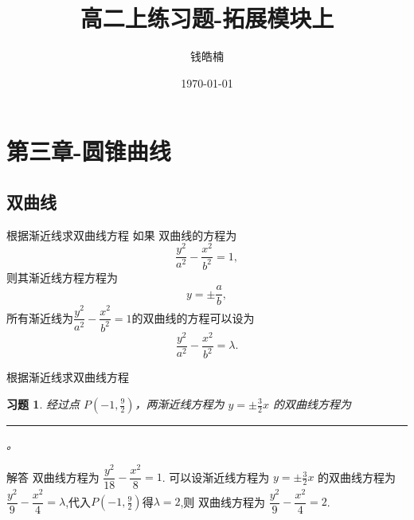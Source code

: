 \documentclass[handout,aspectratio=169]{ctexbeamer}
\newcommand{\uline}{\rule{1cm}{0.6pt}}
\newtheorem{exercise}{习题}[subsection]
\begin{document}

\title{高二上练习题-拓展模块上}
\date{\today}
\author{钱皓楠}
\begin{frame}{}{}
    \titlepage{}
\end{frame}

\section{第三章-圆锥曲线}
\subsection{双曲线}

\begin{frame}{根据渐近线求双曲线方程}{}
如果 双曲线的方程为 $$\dfrac{y^2}{a^2} - \dfrac{x^2}{b^2} = 1,$$则其渐近线方程方程为\[y =\pm \frac{a}{b} ,\]
所有渐近线为$\dfrac{y^2}{a^2} - \dfrac{x^2}{b^2} = 1$的双曲线的方程可以设为\[\dfrac{y^2}{a^2} - \dfrac{x^2}{b^2} = \lambda.\]
\end{frame}


\begin{frame}{根据渐近线求双曲线方程}{}
    \begin{exercise}
        经过点 $P(-1,\frac{9}{2})$，两渐近线方程为 $y = \pm \frac{3}{2}x$ 的双曲线方程为\uline。
    \end{exercise}

    \begin{block}{解答}
        双曲线方程为 $\dfrac{y^2}{18} - \dfrac{x^2}{8} = 1$. 可以设渐近线方程为 $y = \pm \frac{3}{2}x$ 的双曲线方程为  $\dfrac{y^2}{9} - \dfrac{x^2}{4} = \lambda$,代入$P(-1,\frac{9}{2})$得$\lambda = 2$,则 双曲线方程为 $\dfrac{y^2}{9} - \dfrac{x^2}{4} = 2$.
    \end{block}
\end{frame}
\end{document}
